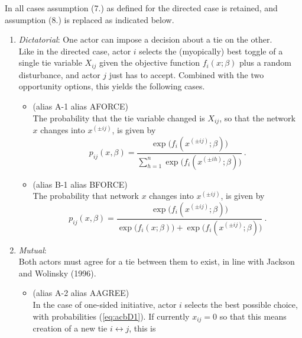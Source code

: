 \documentclass[a4paper,12pt,fleqn]{article}
\begin{document}
In all cases assumption (7.) as defined for the directed case is retained,
and assumption (8.) is replaced as indicated below.
\begin{enumerate}
\item[D.] \emph{Dictatorial}:
      One actor can impose a decision about a tie on the other.\\
      Like in the directed case, actor $i$ selects the (myopically)
      best toggle of a single tie variable
      $X_{ij}$ given the objective function $f_i(x; \beta)$
      plus a random disturbance,
      and actor $j$ just has to accept.
      Combined with the two opportunity options,
      this yields the following cases.
      \begin{itemize}
      \item[8.D.1.] (alias A-1 alias AFORCE) \\
      The probability that the tie variable changed is $X_{ij}$,
      so that the network $x$ changes into $x^{(\pm ij)}$, is given by
      \begin{equation}
        p_{ij}(x, \beta) = \frac{\exp\big(f_i(x^{(\pm ij)}; \beta)\big)}
         {\sum_{h=1}^n \exp\big(f_i(x^{(\pm ih)}; \beta)\big)}  \ .
                                                         \label{eq:acbD1}
      \end{equation}
      \item[8.D.2.] (alias B-1 alias BFORCE) \\
      The probability that
      network $x$ changes into $x^{(\pm ij)}$, is given by
      \begin{equation}
        p_{ij}(x, \beta) = \frac{\exp\big(f_i(x^{(\pm ij)}; \beta)\big)}
         {\exp\big(f_i(x; \beta)\big) + \exp\big(f_i(x^{(\pm ij)}; \beta)\big)}
                                       \ .         \label{eq:acbD2}
      \end{equation}
      \end{itemize}
\item[M.] \emph{Mutual}:\\
      Both actors must agree for a tie between them to exist,
      in line with Jackson and Wolinsky (1996).
      \begin{itemize}
      \item[8.M.1.] (alias A-2 alias AAGREE) \\
      In the case of one-sided initiative, actor $i$ selects the best
      possible choice, with probabilities (\ref{eq:acbD1}).
      If currently $x_{ij} = 0$
      so that this means creation of a new tie $i \leftrightarrow j$, this is

\end{itemize}
\end{enumerate}
\end{document}
